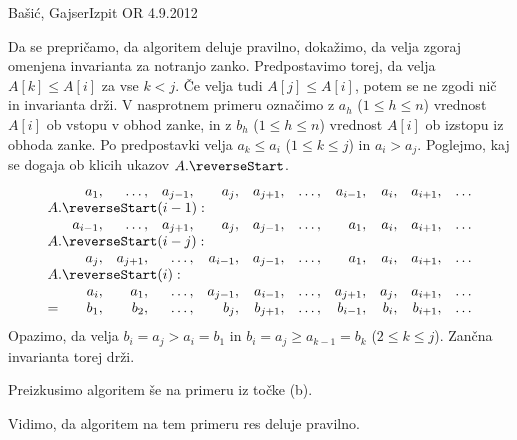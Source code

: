 \begin{naloga}{Bašić, Gajser}{Izpit OR 4.9.2012}
\begin{odgovor}
\begin{enumerate}[(a)]
Da se prepričamo, da algoritem deluje pravilno,
dokažimo, da velja zgoraj omenjena invarianta za notranjo zanko.
Predpostavimo torej, da velja $A[k] \le A[i]$ za vse $k < j$.
Če velja tudi $A[j] \le A[i]$, potem se ne zgodi nič in invarianta drži.
V nasprotnem primeru označimo z $a_h$ ($1 \le h \le n$)
vrednost $A[i]$ ob vstopu v obhod zanke,
in z $b_h$ ($1 \le h \le n$) vrednost $A[i]$ ob izstopu iz obhoda zanke.
Po predpostavki velja $a_k \le a_i$ ($1 \le k \le j$) in $a_i > a_j$.
Poglejmo, kaj se dogaja ob klicih ukazov $A.\reverseStart$.
$$
\begin{array}{rrrrrrrrrrr}
& a_1, & \dots, & a_{j-1}, & a_j, & a_{j+1}, & \dots, & a_{i-1}, & a_i, & a_{i+1}, & \dots \\
\multicolumn{11}{l}{A.\reverseStart(i-1):} \\
& a_{i-1}, & \dots, & a_{j+1}, & a_j, & a_{j-1}, & \dots, & a_1, & a_i, & a_{i+1}, & \dots \\
\multicolumn{11}{l}{A.\reverseStart(i-j):} \\
& a_j, & a_{j+1}, & \dots, & a_{i-1}, & a_{j-1}, & \dots, & a_1, & a_i, & a_{i+1}, & \dots \\
\multicolumn{11}{l}{A.\reverseStart(i):} \\
& a_i, & a_1, & \dots, & a_{j-1}, & a_{i-1}, & \dots, & a_{j+1}, & a_j, & a_{i+1}, & \dots \\
= & b_1, & b_2, & \dots, & b_j, & b_{j+1}, & \dots, & b_{i-1}, & b_i, & b_{i+1}, & \dots
\end{array}
$$
Opazimo,
da velja $b_i = a_j > a_i = b_1$
in $b_i = a_j \ge a_{k-1} = b_k$ ($2 \le k \le j$).
Zančna invarianta torej drži.

Preizkusimo algoritem še na primeru iz točke (b).


Vidimo, da algoritem na tem primeru res deluje pravilno.
\end{enumerate}
\end{odgovor}
\end{naloga}
